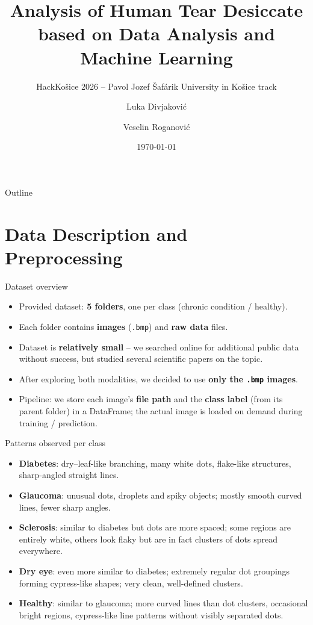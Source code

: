 \documentclass[aspectratio=169]{beamer}
\title[Tear Desiccate Classification]{Analysis of Human Tear Desiccate\\ based on Data Analysis and Machine Learning}
\subtitle{HackKošice 2026 -- Pavol Jozef Šafárik University in Košice track}
\author{Luka Divjakovi\'c \and Veselin Roganovi\'c}
\institute{HackKošice}
\date{\today}
\begin{document}
\begin{frame}
    \titlepage
\end{frame}

\begin{frame}{Outline}
    \tableofcontents
\end{frame}

\section{Data Description and Preprocessing}

\begin{frame}{Dataset overview}
    \begin{itemize}
        \item Provided dataset: \textbf{5 folders}, one per class (chronic condition / healthy).
        \item Each folder contains \textbf{images} (\texttt{.bmp}) and \textbf{raw data} files.
        \item Dataset is \textbf{relatively small} -- we searched online for additional
              public data without success, but studied several scientific papers on the topic.
        \item After exploring both modalities, we decided to use \textbf{only the \texttt{.bmp} images}.
        \item Pipeline: we store each image's \textbf{file path} and the \textbf{class label}
              (from its parent folder) in a DataFrame; the actual image is loaded on demand
              during training / prediction.
    \end{itemize}
\end{frame}

\begin{frame}{Patterns observed per class}
    \small
    \begin{itemize}
        \item \textbf{Diabetes}: dry--leaf-like branching, many white dots, flake-like structures,
              sharp-angled straight lines.
        \item \textbf{Glaucoma}: unusual dots, droplets and spiky objects; mostly smooth curved lines,
              fewer sharp angles.
        \item \textbf{Sclerosis}: similar to diabetes but dots are more spaced; some regions are entirely white,
              others look flaky but are in fact clusters of dots spread everywhere.
        \item \textbf{Dry eye}: even more similar to diabetes; extremely regular dot groupings forming
              cypress-like shapes; very clean, well-defined clusters.
        \item \textbf{Healthy}: similar to glaucoma; more curved lines than dot clusters, occasional bright
              regions, cypress-like line patterns without visibly separated dots.
    \end{itemize}
\end{frame}
\end{document}
